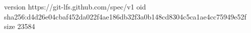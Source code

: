 version https://git-lfs.github.com/spec/v1
oid sha256:d4d26e04cbaf452da022f4ae186db32f3a0b148cd8304c5ca1ae4cc75949e52f
size 23584

